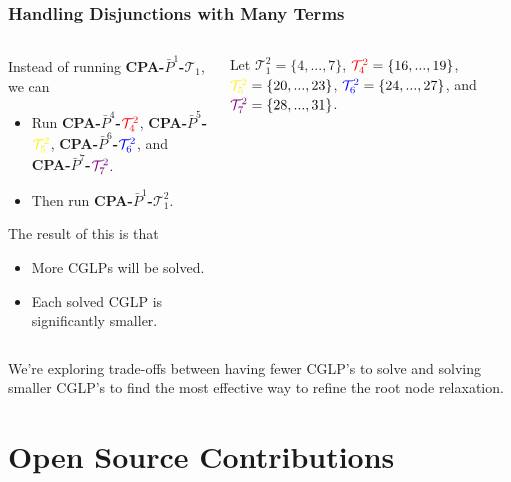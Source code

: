 \documentclass{beamer}
\begin{document}
	\begin{frame}[t]
		\frametitle{Handling Disjunctions with Many Terms}
		\small
		\begin{columns}[T]
			\begin{column}{0.5\textwidth}
				Instead of running \textbf{CPA-$ \bar{P}^1 $-$ \mathcal{T}_1 $}, we can
				\begin{itemize}
					\item Run \textbf{CPA-$ \bar{P}^4 $-$ \textcolor{red}{\mathcal{T}^2_4} $}, \textbf{CPA-$ \bar{P}^5 $-$ \textcolor{yellow}{\mathcal{T}^2_5} $}, \textbf{CPA-$ \bar{P}^6 $-$ \textcolor{blue}{\mathcal{T}^2_6} $}, and \textbf{CPA-$ \bar{P}^7 $-$ \textcolor{violet}{\mathcal{T}^2_7} $}.
					\item Then run \textbf{CPA-$ \bar{P}^1 $-$ \mathcal{T}^2_1 $}.
				\end{itemize}
				The result of this is that
				\begin{itemize}
					\item More CGLPs will be solved.
					\item Each solved CGLP is significantly smaller.
				\end{itemize}
			\end{column}
			\begin{column}{0.5\textwidth}
				\vspace{-.25cm}
				\begin{figure}[h]
					\label{p:tree2}
				\end{figure}
				Let $ \mathcal{T}^2_1 = \{4, ..., 7\} $, $ \textcolor{red}{\mathcal{T}^2_4} = \{16, ..., 19\} $, $ \textcolor{yellow}{\mathcal{T}^2_5} = \{20, ..., 23\} $, $ \textcolor{blue}{\mathcal{T}^2_6} = \{24, ..., 27\} $, and $ \textcolor{violet}{\mathcal{T}^2_7} = \{28, ..., 31\} $.
			\end{column}
		\end{columns}
		\vspace{1cm}
		\begin{block}{}
			We're exploring trade-offs between having fewer CGLP's to solve and solving smaller CGLP's to find the most effective way to refine the root node relaxation.
		\end{block}
		\normalsize
	\end{frame}

	\section{Open Source Contributions}
	
\end{document}
